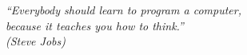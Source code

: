 \begin{epigrafe}
  \vspace*{\fill}
	\begin{flushright}
		\textit{``Everybody should learn to program a computer,\\
		because it teaches you how to think.''\\
		(Steve Jobs)}
	\end{flushright}
\end{epigrafe}
